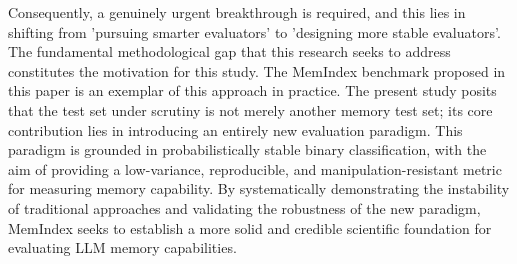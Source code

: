Consequently, a genuinely urgent breakthrough is required, and this lies in shifting from 'pursuing smarter evaluators' to 'designing more stable evaluators'. The fundamental methodological gap that this research seeks to address constitutes the motivation for this study. The MemIndex benchmark proposed in this paper is an exemplar of this approach in practice. The present study posits that the test set under scrutiny is not merely another memory test set; its core contribution lies in introducing an entirely new evaluation paradigm. This paradigm is grounded in probabilistically stable binary classification, with the aim of providing a low-variance, reproducible, and manipulation-resistant metric for measuring memory capability. By systematically demonstrating the instability of traditional approaches and validating the robustness of the new paradigm, MemIndex seeks to establish a more solid and credible scientific foundation for evaluating LLM memory capabilities.
